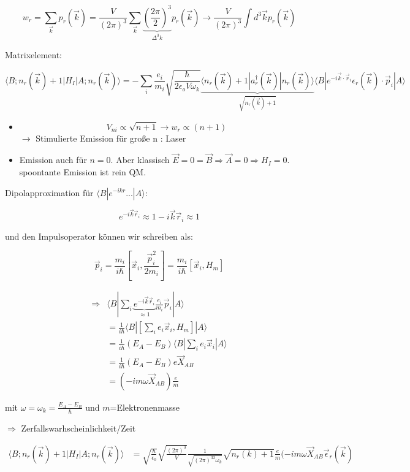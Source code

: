 \[w_r = \sum_{\vec k}p_r(\vec k) = \frac{V}{(2\pi)^3}\sum_{\vec k}\underbrace{(\frac{2\pi}{2})^3}_{\Delta^3k}p_r(\vec k)\rightarrow \frac{V}{(2\pi)^3}\int d^3\vec k p_r(\vec k)\]

Matrixelement:

\[\langle B;n_r(\vec k) +1 |H_I|A;n_r(\vec k)\rangle = -\sum_i \frac{e_i}{m_i}\sqrt{\frac{\hbar}{2\epsilon_o V\omega_k}}\underbrace{\langle n_r(\vec k) +1 |a^\dagger_r(\vec k)|n_r(\vec k)\rangle }_{\sqrt{n_r(\vec k)+1}} \langle B|e^{-i\vec k\cdot\vec r_i}\epsilon_r(\vec k)\cdot \vec p_i|A\rangle \]


\begin{itemize}
\item 
\[V_{ni}\propto \sqrt{n+1} \rightarrow w_r\propto (n+1)\]
\(\rightarrow \) Stimulierte Emission für große n : Laser

\item Emission auch für \(n=0\). Aber klassisch \(\vec E = 0=\vec B \Rightarrow \vec A=0\Rightarrow H_I=0\). spoontante Emission ist rein QM.

\end{itemize}


Dipolapproximation für \(\langle B|e^{-ikr}...|A\rangle \):

\[e^{-i\vec k\vec r_i}\approx 1-i\vec k\vec r_i\approx 1\]

und den Impulsoperator können wir schreiben als:

\[\vec p_i = \frac{m_i}{i\hbar} [\vec x_i,\frac{\vec p_i^2}{2m_i}] = \frac{m_i}{i\hbar} [\vec x_i,H_m]  \]


\begin{align}
\Rightarrow &\langle B|\sum_i \underbrace{e^{-i\vec k\vec r_i}}_{\approx 1} \frac{e_i}{m_i}\vec p_i|A\rangle \\
&=\frac{1}{i\hbar} \langle B|[\sum_i e_i \vec x_i,H_m] |A\rangle \\
&=\frac{1}{i\hbar} (E_A-E_B) \langle B|\sum_i e_i\vec x_i|A\rangle\\
&=\frac{1}{i\hbar} (E_A-E_B) e\vec X_{AB}\\
&= (-im\omega \vec X_{AB})\frac{e}{m}
\end{align}


mit \(\omega = \omega_k = \frac{E_A-E_B}{\hbar}\) und \(m\)=Elektronenmasse


\(\Rightarrow \) Zerfallswarhscheinlichkeit/Zeit


\begin{align}
\langle B;n_r(\vec k) +1 |H_I|A;n_r(\vec k)\rangle &= \sqrt{\frac{\hbar}{\epsilon_0}}\sqrt{\frac{(2\pi)^3}{V}}\frac{1}{\sqrt{(2\pi)^32\omega_k}}\sqrt{n_r(k)+1}\frac{e}{m}(-im\omega\vec X_{AB}\vec \epsilon_r(\vec k) \\
\end{align}


